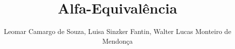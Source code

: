 \documentclass{llncs}
\begin{document}
	\title{Alfa-Equivalência}
	\author{Leomar Camargo de Souza, Luisa Sinzker Fantin, Walter Lucas Monteiro de Mendonça}


	\maketitle

	

	
	
\end{document}
